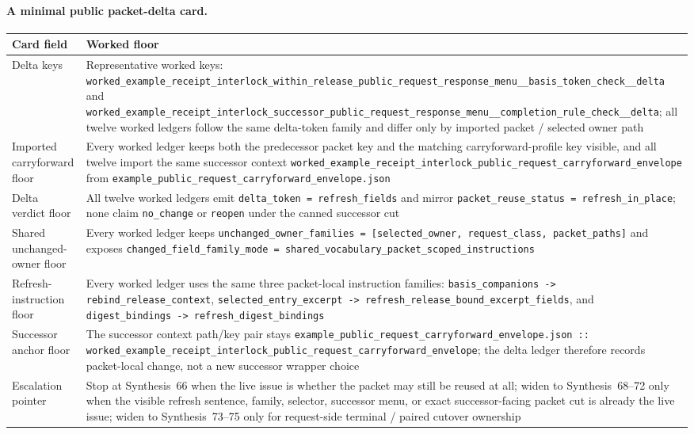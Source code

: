 \documentclass[11pt]{article}
\begin{document}
\paragraph{A minimal public packet-delta card.}
\begin{table}[t]
\centering
\footnotesize
\begin{tabularx}{\linewidth}{@{}l X@{}}
\toprule
Card field & Worked floor \\
\midrule
Delta keys & Representative worked keys: \nolinkurl{worked_example_receipt_interlock_within_release_public_request_response_menu__basis_token_check__delta} and \nolinkurl{worked_example_receipt_interlock_successor_public_request_response_menu__completion_rule_check__delta}; all twelve worked ledgers follow the same delta-token family and differ only by imported packet / selected owner path \\
Imported carryforward floor & Every worked ledger keeps both the predecessor packet key and the matching carryforward-profile key visible, and all twelve import the same successor context \nolinkurl{worked_example_receipt_interlock_public_request_carryforward_envelope} from \nolinkurl{example_public_request_carryforward_envelope.json} \\
Delta verdict floor & All twelve worked ledgers emit \nolinkurl{delta_token = refresh_fields} and mirror \nolinkurl{packet_reuse_status = refresh_in_place}; none claim \nolinkurl{no_change} or \nolinkurl{reopen} under the canned successor cut \\
Shared unchanged-owner floor & Every worked ledger keeps \nolinkurl{unchanged_owner_families = [selected_owner, request_class, packet_paths]} and exposes \nolinkurl{changed_field_family_mode = shared_vocabulary_packet_scoped_instructions} \\
Refresh-instruction floor & Every worked ledger uses the same three packet-local instruction families: \nolinkurl{basis_companions -> rebind_release_context}, \nolinkurl{selected_entry_excerpt -> refresh_release_bound_excerpt_fields}, and \nolinkurl{digest_bindings -> refresh_digest_bindings} \\
Successor anchor floor & The successor context path/key pair stays \nolinkurl{example_public_request_carryforward_envelope.json :: worked_example_receipt_interlock_public_request_carryforward_envelope}; the delta ledger therefore records packet-local change, not a new successor wrapper choice \\
Escalation pointer & Stop at Synthesis~66 when the live issue is whether the packet may still be reused at all; widen to Synthesis~68--72 only when the visible refresh sentence, family, selector, successor menu, or exact successor-facing packet cut is already the live issue; widen to Synthesis~73--75 only for request-side terminal / paired cutover ownership \\

\end{tabularx}
\end{table}
\end{document}

